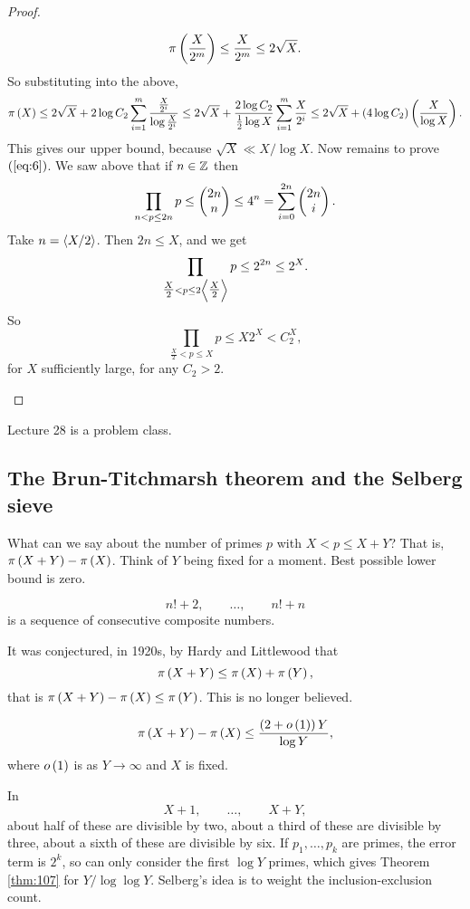 \begin{proof}
\begin{itemize}
$$ \pi\left( \dfrac{X}{2^m} \right) \le \dfrac{X}{2^m} \le 2\sqrt{X}. $$
So substituting into the above,
$$ \pi\left( X \right) \le 2\sqrt{X} + 2\log C_2\sum_{i = 1}^m \dfrac{\tfrac{X}{2^i}}{\log \tfrac{X}{2^i}} \le 2\sqrt{X} + \dfrac{2\log C_2}{\tfrac{1}{2}\log X}\sum_{i = 1}^m \dfrac{X}{2^i} \le 2\sqrt{X} + \left( 4\log C_2 \right)\left( \dfrac{X}{\log X} \right). $$
This gives our upper bound, because $ \sqrt{X} \ll X / \log X $. Now remains to prove $ \left( \ref{eq:6} \right) $. We saw above that if $ n \in \mathbb{Z} $ then
$$ \prod_{n < p \le 2n} p \le \begin{pmatrix} 2n \\ n \end{pmatrix} \le 4^n = \sum_{i = 0}^{2n} \begin{pmatrix} 2n \\ i \end{pmatrix}. $$
Take $ n = \left\langle X / 2 \right\rangle $. Then $ 2n \le X $, and we get
$$ \prod_{\tfrac{X}{2} < p \le 2\left\langle \tfrac{X}{2} \right\rangle} p \le 2^{2n} \le 2^X. $$
So
$$ \prod_{\tfrac{X}{2} < p \le X} p \le X2^X < C_2^X, $$
for $ X $ sufficiently large, for any $ C_2 > 2 $.
\end{itemize}
\end{proof}


Lecture 28 is a problem class.


\subsection{The Brun-Titchmarsh theorem and the Selberg sieve}

What can we say about the number of primes $ p $ with $ X < p \le X + Y $? That is, $ \pi\left( X + Y \right) - \pi\left( X \right) $. Think of $ Y $ being fixed for a moment. Best possible lower bound is zero.

\begin{example2}
$$ n! + 2, \qquad \dots, \qquad n! + n $$
is a sequence of consecutive composite numbers.
\end{example2}

It was conjectured, in 1920s, by Hardy and Littlewood that
$$ \pi\left( X + Y \right) \le \pi\left( X \right) + \pi\left( Y \right), $$
that is $ \pi\left( X + Y \right) - \pi\left( X \right) \le \pi\left( Y \right) $. This is no longer believed.

\begin{theorem}
\label{thm:107}
$$ \pi\left( X + Y \right) - \pi\left( X \right) \le \dfrac{\left( 2 + o\left( 1 \right) \right)Y}{\log Y}, $$
where $ o\left( 1 \right) $ is as $ Y \to \infty $ and $ X $ is fixed.
\end{theorem}

In
$$ X + 1, \qquad \dots, \qquad X + Y, $$
about half of these are divisible by two, about a third of these are divisible by three, about a sixth of these are divisible by six. If $ p_1, \dots, p_k $ are primes, the error term is $ 2^k $, so can only consider the first $ \log Y $ primes, which gives Theorem \ref{thm:107} for $ Y / \log \log Y $. Selberg's idea is to weight the inclusion-exclusion count.

